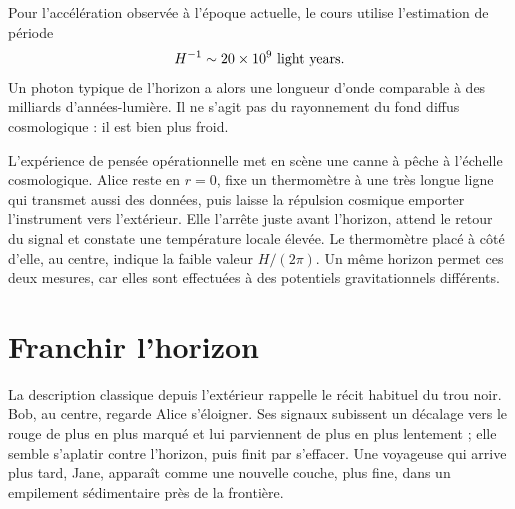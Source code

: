 
Pour l’accélération observée à l’époque actuelle, le cours utilise l’estimation de période
\begin{equation}
H^{-1}\sim 20\times10^9\ {\rm light\ years}.
\label{eq:l09-lecture-horizon-estimate}
\end{equation}
Un photon typique de l’horizon a alors une longueur d’onde comparable à des milliards d’années-lumière. Il ne s’agit pas du rayonnement du fond diffus cosmologique : il est bien plus froid.

L’expérience de pensée opérationnelle met en scène une canne à pêche à l’échelle cosmologique. Alice reste en \(r=0\), fixe un thermomètre à une très longue ligne qui transmet aussi des données, puis laisse la répulsion cosmique emporter l’instrument vers l’extérieur. Elle l’arrête juste avant l’horizon, attend le retour du signal et constate une température locale élevée. Le thermomètre placé à côté d’elle, au centre, indique la faible valeur \(H/(2\pi)\). Un même horizon permet ces deux mesures, car elles sont effectuées à des potentiels gravitationnels différents.

\section{Franchir l’horizon}

La description classique depuis l’extérieur rappelle le récit habituel du trou noir. Bob, au centre, regarde Alice s’éloigner. Ses signaux subissent un décalage vers le rouge de plus en plus marqué et lui parviennent de plus en plus lentement ; elle semble s’aplatir contre l’horizon, puis finit par s’effacer. Une voyageuse qui arrive plus tard, Jane, apparaît comme une nouvelle couche, plus fine, dans un empilement sédimentaire près de la frontière.

\begin{classroomqa}
\end{classroomqa}

